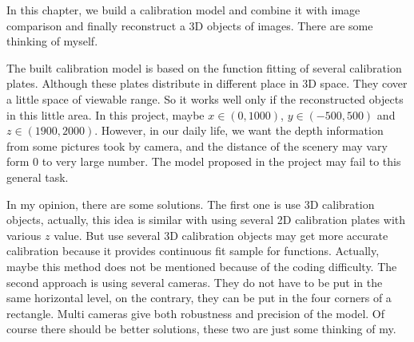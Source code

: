In this chapter, we build a calibration model and combine it with image comparison and finally reconstruct a 3D objects of images. There are some thinking of myself. 

The built calibration model is based on the function fitting of several calibration plates. Although these plates distribute in different place in 3D space. They cover a little space of viewable range. So it works well only if the reconstructed objects in this little area. In this project, maybe $x\in (0,1000)$, $y\in (-500,500)$ and $z\in (1900,2000)$. However, in our daily life, we want the depth information from some pictures took by camera, and the distance of the scenery may vary form 0 to very large number. The model proposed in the project may fail to this general task. 

In my opinion, there are some solutions. The first one is use 3D calibration objects, actually, this idea is similar with using several 2D calibration plates with various $z$ value. But use several 3D calibration objects may get more accurate calibration because it provides continuous fit sample for functions. Actually, maybe this method does not be mentioned because of the coding difficulty. The second approach is using several cameras. They do not have to be put in the same horizontal level, on the contrary, they can be put in the four corners of a rectangle. Multi cameras give both robustness and precision of the model. Of course there should be better solutions, these two are just some thinking of my.

